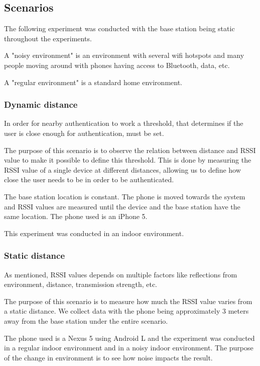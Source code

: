 
\subsection{Scenarios}

The following experiment was conducted with the base station being static throughout the experiments.

A "noisy environment" is an environment with several wifi hotspots and many people moving around with phones having access to Bluetooth, data, etc.

A "regular environment" is a standard home environment.


\subsubsection{Dynamic distance}
\label{section:MovingTowardsSystem}
In order for nearby authentication to work a threshold, that determines if the user is close enough for authentication, must be set.

The purpose of this scenario is to observe the relation between distance and RSSI value to make it possible to  define  this threshold. This is done by measuring the RSSI value of a single device at different distances, allowing us to define how close the user needs to be in order to be authenticated.

The base station location is constant. The phone is moved towards the system and RSSI values are measured until the device and the base station have the same location. The phone used is an iPhone 5.

This experiment was conducted in an indoor environment.


\subsubsection{Static distance}
\label{section:MovingTowardsSystem}
As mentioned, RSSI values depends on multiple factors like reflections from environment, distance, transmission strength, etc. 

The purpose of this scenario is to measure how much the RSSI value varies from a static distance. We collect data with the phone being approximately 3 meters away from the base station under the entire scenario.

The phone used is a Nexus 5 using Android L and the experiment was conducted in a regular indoor environment and in a noisy indoor environment. The purpose of the change in environment is to see how noise impacts the result.



